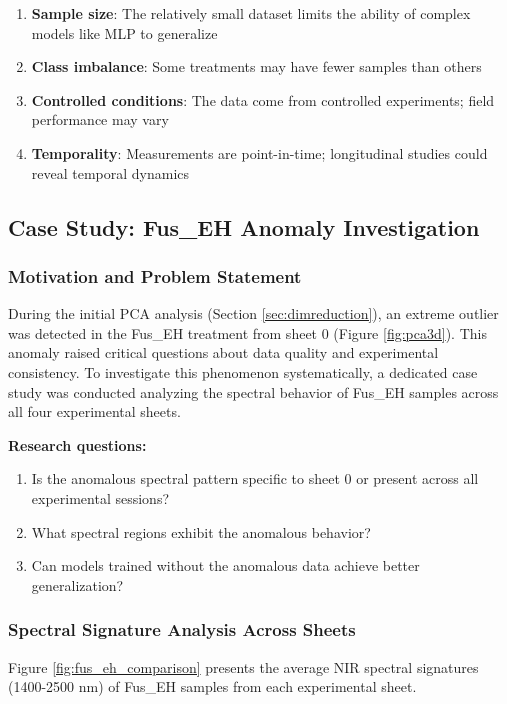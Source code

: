 \documentclass[12pt,a4paper]{article}
\begin{document}
\begin{enumerate}
    \item \textbf{Sample size}: The relatively small dataset limits the ability of complex models like MLP to generalize
    \item \textbf{Class imbalance}: Some treatments may have fewer samples than others
    \item \textbf{Controlled conditions}: The data come from controlled experiments; field performance may vary
    \item \textbf{Temporality}: Measurements are point-in-time; longitudinal studies could reveal temporal dynamics
\end{enumerate}

\newpage
\subsection{Case Study: Fus\_EH Anomaly Investigation}
\label{subsec:fus_eh_case}

\subsubsection{Motivation and Problem Statement}

During the initial PCA analysis (Section \ref{sec:dimreduction}), an extreme outlier was detected in the Fus\_EH treatment from sheet 0 (Figure \ref{fig:pca3d}). This anomaly raised critical questions about data quality and experimental consistency. To investigate this phenomenon systematically, a dedicated case study was conducted analyzing the spectral behavior of Fus\_EH samples across all four experimental sheets.

\textbf{Research questions:}
\begin{enumerate}
    \item Is the anomalous spectral pattern specific to sheet 0 or present across all experimental sessions?
    \item What spectral regions exhibit the anomalous behavior?
    \item Can models trained without the anomalous data achieve better generalization?
\end{enumerate}

\subsubsection{Spectral Signature Analysis Across Sheets}

Figure \ref{fig:fus_eh_comparison} presents the average NIR spectral signatures (1400-2500 nm) of Fus\_EH samples from each experimental sheet.
\end{document}
